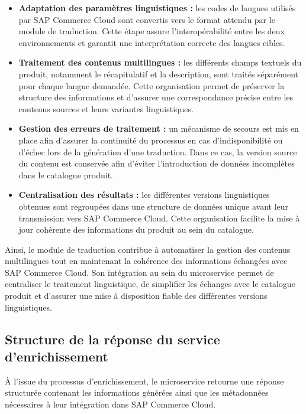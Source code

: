 \begin{itemize}
    \item \textbf{Adaptation des paramètres linguistiques :} les codes de langues utilisés par SAP Commerce Cloud sont convertis vers le format attendu par le module de traduction. Cette étape assure l'interopérabilité entre les deux environnements et garantit une interprétation correcte des langues cibles.

    \item \textbf{Traitement des contenus multilingues :} les différents champs textuels du produit, notamment le récapitulatif et la description, sont traités séparément pour chaque langue demandée. Cette organisation permet de préserver la structure des informations et d'assurer une correspondance précise entre les contenus sources et leurs variantes linguistiques.
    \item \textbf{Gestion des erreurs de traitement :} un mécanisme de secours est mis en place afin d'assurer la continuité du processus en cas d'indisponibilité ou d'échec lors de la génération d'une traduction. Dans ce cas, la version source du contenu est conservée afin d'éviter l'introduction de données incomplètes dans le catalogue produit.

    \item \textbf{Centralisation des résultats :} les différentes versions linguistiques obtenues sont regroupées dans une structure de données unique avant leur transmission vers SAP Commerce Cloud. Cette organisation facilite la mise à jour cohérente des informations du produit au sein du catalogue.
\end{itemize}

Ainsi, le module de traduction contribue à automatiser la gestion des contenus multilingues tout en maintenant la cohérence des informations échangées avec SAP Commerce Cloud. Son intégration au sein du microservice permet de centraliser le traitement linguistique, de simplifier les échanges avec le catalogue produit et d'assurer une mise à disposition fiable des différentes versions linguistiques.

\subsection{Structure de la réponse du service d'enrichissement}

À l'issue du processus d'enrichissement, le microservice retourne une réponse structurée contenant les informations générées ainsi que les métadonnées nécessaires à leur intégration dans SAP Commerce Cloud.

